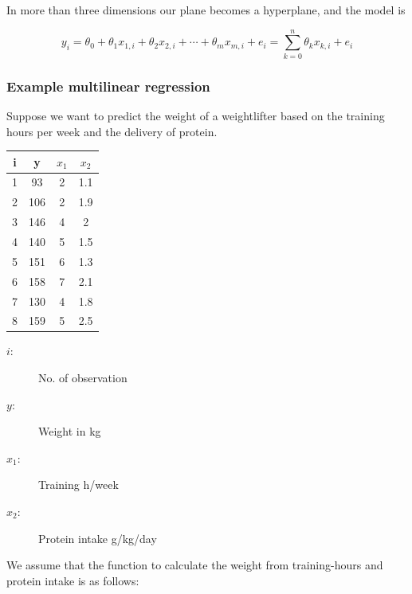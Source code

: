 \documentclass[a4paper, 11pt]{article}
\renewcommand*{\thead}[1]{\bfseries #1}
\begin{document}
In more than three dimensions our plane becomes a hyperplane, and the model is

\begin{equation*}
	y_i = \theta_0 + \theta_1 x_{1,i} + \theta_2 x_{2,i} + \cdots + \theta_m x_{m,i}  + e_i=\sum_{k=0}^{n}\theta_k x_{k,i} + e_i
\end{equation*}

\subsubsection{Example multilinear regression}

Suppose we want to predict the weight of a weightlifter based on the training hours per week and the delivery of protein.

\vspace{10px}

\begin{minipage}{0.25\textwidth}
    \begin{tabular}{cccc}
        \toprule
        \thead{i} & \thead{y} & \thead{$x_1$} & \thead{$x_2$} \\
        \hline
        1 & 93 & 2 & 1.1 \\
        \hline
        2 & 106 & 2 & 1.9 \\
        \hline
        3 & 146 & 4 & 2 \\
        \hline
        4 & 140 & 5 & 1.5  \\
        \hline
        5 & 151 & 6 & 1.3 \\
        \hline
        6 & 158 & 7 & 2.1 \\
        \hline
        7 & 130 & 4 & 1.8 \\
        \hline
        8 & 159 & 5 & 2.5 \\
        \bottomrule
    \end{tabular}
\end{minipage}\hfill
\begin{minipage}{0.75\textwidth}
    \begin{description}
        \item[$i$: ] No. of observation
        \item[$y$: ] Weight in kg
        \item[$x_1$: ] Training h/week
        \item[$x_2$: ] Protein intake g/kg/day
    \end{description}

    We assume that the function to calculate the weight from training-hours and protein intake is as follows:
\end{minipage}
\end{document}

